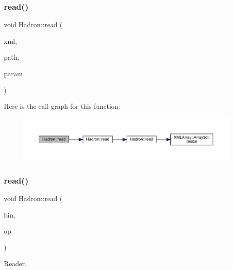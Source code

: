 \subsubsection{\texorpdfstring{read()}{read()}\hspace{0.1cm}{\footnotesize\ttfamily [86/94]}}
{\footnotesize\ttfamily void Hadron\+::read (\begin{DoxyParamCaption}\item[{\mbox{\hyperlink{classADATXML_1_1XMLReader}{X\+M\+L\+Reader}} \&}]{xml,  }\item[{const std\+::string \&}]{path,  }\item[{\mbox{\hyperlink{structHadron_1_1SingleHadronQuarkDeriv__t}{Single\+Hadron\+Quark\+Deriv\+\_\+t}} \&}]{param }\end{DoxyParamCaption})}

Here is the call graph for this function\+:
\nopagebreak
\begin{figure}[H]
\begin{center}
\leavevmode
\includegraphics[width=350pt]{d1/daf/namespaceHadron_a0b9e3ade4af9d7765000d9cd6477956e_cgraph}
\end{center}
\end{figure}
\mbox{\label{namespaceHadron_ad5dee2ca1e22f01bd860ef607035e36f}} 
\subsubsection{\texorpdfstring{read()}{read()}\hspace{0.1cm}{\footnotesize\ttfamily [87/94]}}
{\footnotesize\ttfamily void Hadron\+::read (\begin{DoxyParamCaption}\item[{\mbox{\hyperlink{classADATIO_1_1BinaryReader}{Binary\+Reader}} \&}]{bin,  }\item[{\mbox{\hyperlink{structHadron_1_1SingleHadronQuarkDeriv__t}{Single\+Hadron\+Quark\+Deriv\+\_\+t}} \&}]{op }\end{DoxyParamCaption})}



Reader. 


